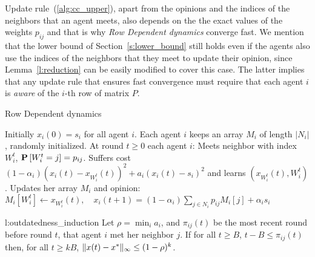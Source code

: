 \begin{remark}
  Update rule~(\ref{alg:cc_upper}), apart from the opinions
  and the indices of the neighbors that an agent meets,
  also depends on the the exact values of the weights $p_{ij}$ and that is
  why \emph{Row Dependent dynamics} converge fast. We mention that the lower bound of
  Section~\ref{s:lower_bound} still holds even if the agents also use the indices
  of the neighbors that they meet to update their opinion, since
  Lemma~\ref{l:reduction} can be easily modified to
  cover this case. The latter implies that any update rule that
  ensures fast convergence must require that each agent
  $i$ is \emph{aware} of the $i$-th row of matrix $P$.

\end{remark}
\vspace{-5mm}
\begin{algorithm*}
  \caption{Row Dependent dynamics}
  \label{alg:influence_dependent}
  \begin{algorithmic}[1]
    \STATE Initially $x_i(0) = s_i$ for all agent $i$.
    \STATE Each agent $i$ keeps an array $M_i$ of length $|N_i|$,
    randomly initialized.
    \STATE At round $t\geq 0$ each agent $i$:
    \bindent
    \STATE Meets neighbor with index $W_i^t$, $\bm{\mathrm{P}}\left[W_i^t=j\right]=p_{ij}$.
    \STATE Suffers cost \((1-\alpha_i) (x_i(t) - x_{W_i^t}(t))^2 + a_i (x_i(t) - s_i)^2\)
    and learns $(x_{W_i^t}(t),W_i^t)$.
    \STATE Updates her array $M_i$ and opinion:
    $
    M_i[W_i^t] \gets x_{W_i^t}(t),\quad
    x_i(t+1) = (1-\alpha_i)\sum_{j \in N_i} p_{ij} M_i[j] + \alpha_i s_i
    $
    \eindent
  \end{algorithmic}
\end{algorithm*}

\begin{replemma}{l:outdatedness_induction}
  Let $\rho = \min_i a_i$, and $\pi_{ij}(t)$ be the most recent round
  before round $t$, that agent $i$ met her neighbor $j$.
  If for all $t\geq B$, $t-B \leq \pi_{ij}(t)$ then, for
  all $t \geq k B$,
  \(\| x(t) - x^* \|_{\infty} \leq (1-\rho)^k\).
\end{replemma}

